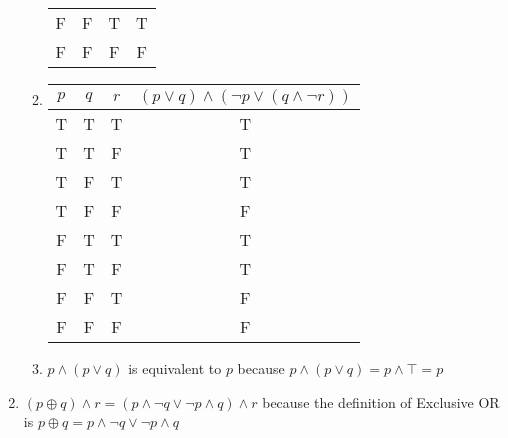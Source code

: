 \documentclass{article}
\begin{document}
\begin{enumerate}
\begin{enumerate}
\begin{tabular}{|c|c|c|c|}
            F & F & T & T \\
            F & F & F & F \\
            \hline
        \end{tabular}
        \item 
        \begin{tabular}{|c|c|c|c|}
            \hline
            $p$ & $q$ & $r$ & $(p \lor q) \land (\neg p \lor (q \land \neg r))$ \\
            \hline
            T & T & T & T \\
            T & T & F & T \\
            T & F & T & T \\
            T & F & F & F \\
            F & T & T & T \\
            F & T & F & T \\
            F & F & T & F \\
            F & F & F & F \\
            \hline
        \end{tabular}
        \item $p \land (p \lor q)$ is equivalent to $p$ because $p \land (p \lor q) = p \land \top = p$
    \end{enumerate}
    \item $(p \oplus q) \land r = (p \land \neg q \lor \neg p \land q) \land r$ because the definition of Exclusive OR is $p \oplus q = p \land \neg q \lor \neg p \land q$
\end{enumerate}
\end{document}
